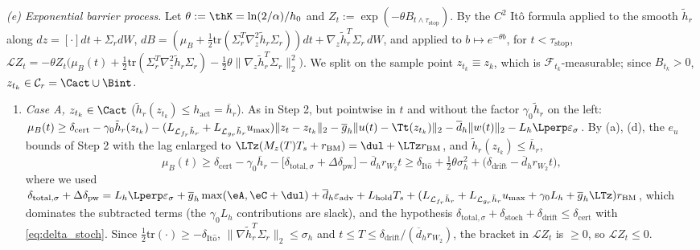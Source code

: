 \emph{(e) Exponential barrier process.} Let \(\theta := \thK = \ln(2/\alpha)/h_0\) and \(Z_t := \exp(-\theta B_{t\wedge\tau_{\mathrm{stop}}})\). By the \(C^2\) It\^o formula applied to the smooth \(\tilde h_r\) along \(dz = [\cdot]dt + \Sigma_r dW\), \(dB = (\mu_B + \frac12\mathrm{tr}(\Sigma_r^T\nabla_z^2\tilde h_r\Sigma_r))dt + \nabla_z\tilde h_r^T\Sigma_r\,dW\), and applied to \(b \mapsto e^{-\theta b}\), for \(t < \tau_{\mathrm{stop}}\),
\(\mathcal{L}Z_t = -\theta Z_t\big(\mu_B(t) + \frac{1}{2}\mathrm{tr}(\Sigma_r^T\nabla_z^2\tilde{h}_r\Sigma_r) - \frac{1}{2}\theta\|\nabla_z\tilde{h}_r^T\Sigma_r\|_2^2\big)\). We split on the sample point \(z_{t_k} \equiv z_k\), which is \(\mathcal{F}_{t_k}\)-measurable; since \(B_{t_k} > 0\), \(z_{t_k} \in \mathcal{C}_r = \Cact \cup \Bint\).
\begin{enumerate}
    \item \emph{Case A, \(z_{t_k} \in \Cact\)} (\(\tilde h_r(z_{t_k}) \le h_{\mathrm{act}} = \overline h_r\)). As in Step 2, but pointwise in \(t\) and without the factor \(\gamma_0\tilde h_r\) on the left: \(\mu_B(t) \ge \delta_{\mathrm{cert}} - \gamma_0\tilde h_r(z_{t_k}) - (L_{\mathcal{L}_{f_r}\tilde h_r} + L_{\mathcal{L}_{g_r}\tilde h_r}u_{\max})\|z_t - z_{t_k}\|_2 - \overline g_h\|u(t) - \Tt(z_{t_k})\|_2 - \overline d_h\|w(t)\|_2 - L_h\Lperp\varepsilon_\sigma\). By (a), (d), the \(e_u\) bounds of Step 2 with the lag enlarged to \(\LTz(M_z(T)T_s + r_{\mathrm{BM}}) = \dul + \LTz r_{\mathrm{BM}}\), and \(\tilde h_r(z_{t_k}) \le \overline h_r\),
    \[
    \mu_B(t) \ge \delta_{\mathrm{cert}} - \gamma_0\overline h_r - \big[\delta_{\mathrm{total},\sigma} + \Delta\delta_{\mathrm{pw}}\big] - \overline d_hr_{W_2}t \ge \delta_{\mathrm{It\hat o}} + \tfrac12\theta\sigma_h^2 + \big(\delta_{\mathrm{drift}} - \overline d_hr_{W_2}t\big),
    \]
    where we used \(\delta_{\mathrm{total},\sigma} + \Delta\delta_{\mathrm{pw}} = L_h\Lperp\varepsilon_\sigma + \overline g_h\max(\eA, \eC + \dul) + \overline d_h\varepsilon_{\mathrm{adv}} + L_{\mathrm{hold}}T_s + (L_{\mathcal{L}_{f_r}\tilde h_r} + L_{\mathcal{L}_{g_r}\tilde h_r}u_{\max} + \gamma_0L_h + \overline g_h\LTz)r_{\mathrm{BM}}\), which dominates the subtracted terms (the \(\gamma_0L_h\) contributions are slack), and the hypothesis \(\delta_{\mathrm{total},\sigma} + \delta_{\mathrm{stoch}} + \delta_{\mathrm{drift}} \le \delta_{\mathrm{cert}}\) with \eqref{eq:delta_stoch}. Since \(\frac12\mathrm{tr}(\cdot) \ge -\delta_{\mathrm{It\hat o}}\), \(\|\nabla\tilde h_r^T\Sigma_r\|_2 \le \sigma_h\) and \(t \le T \le \delta_{\mathrm{drift}}/(\overline d_hr_{W_2})\), the bracket in \(\mathcal{L}Z_t\) is \(\ge 0\), so \(\mathcal{L}Z_t \le 0\).

\end{enumerate}
